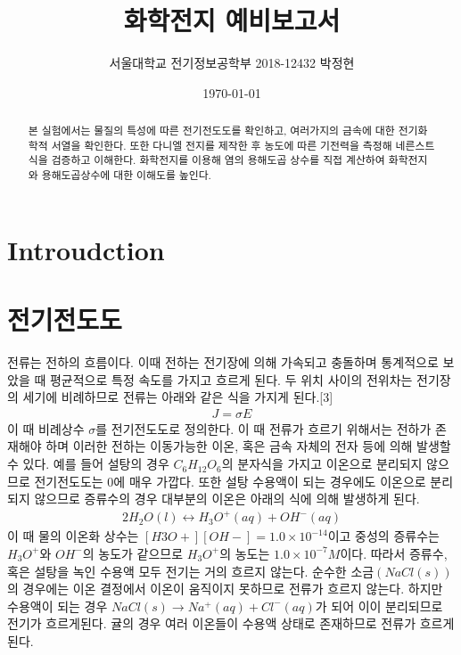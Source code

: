 \documentclass[%
 reprint,
 amsmath,amssymb,
 aps,
]{revtex4-2}
\begin{document}
\title{화학전지 예비보고서}

\author{서울대학교 전기정보공학부 2018-12432 박정현}
\date{\today}%

\begin{abstract}
본 실험에서는 물질의 특성에 따른 전기전도도를 확인하고, 여러가지의 금속에 대한 전기화학적 서열을 확인한다. 또한 다니엘 전지를 제작한 후 농도에 따른 기전력을 측정해 네른스트 식을 검증하고 이해한다. 화학전지를 이용해 염의 용해도곱 상수를 직접 계산하여 화학전지와 용해도곱상수에 대한 이해도를 높인다. 
\end{abstract}

\maketitle


\section{\label{sec:level1}Introudction}
\section{\label{sec:level2}전기전도도}
전류는 전하의 흐름이다. 이때 전하는 전기장에 의해 가속되고 충돌하며 통계적으로 보았을 때 평균적으로 특정 속도를 가지고 흐르게 된다. 두 위치 사이의 전위차는 전기장의 세기에 비례하므로 전류는 아래와 같은 식을 가지게 된다.[3]
\begin{align}
J =\sigma E
\end{align}
이 때 비례상수 $\sigma$를 전기전도도로 정의한다. 이 때 전류가 흐르기 위해서는 전하가 존재해야 하며 이러한 전하는 이동가능한 이온, 혹은 금속 자체의 전자 등에 의해 발생할 수 있다. 예를 들어 설탕의 경우 $C_{6}H_{12}O_{6}$의 분자식을 가지고 이온으로 분리되지 않으므로 전기전도도는 0에 매우 가깝다. 또한 설탕 수용액이 되는 경우에도 이온으로 분리되지 않으므로 증류수의 경우 대부분의 이온은 아래의 식에 의해 발생하게 된다.
\begin{align}
2H_{2}O(l) \leftrightarrow H_{3}O^{+}(aq) + OH^{-}(aq)
\end{align}
이 때 물의 이온화 상수는 $[H3O+][OH-] = 1.0\times10^{-14}$이고 중성의 증류수는 $H_{3}O^{+}$와 $OH^{-}$의 농도가 같으므로 $H_{3}O^{+}$의 농도는 $1.0\times 10^{-7}M$이다. 따라서 증류수, 혹은 설탕을 녹인 수용액 모두 전기는 거의 흐르지 않는다. 순수한 소금$(NaCl(s))$의 경우에는 이온 결정에서 이온이 움직이지 못하므로 전류가 흐르지 않는다. 하지만 수용액이 되는 경우 $NaCl(s) \rightarrow Na^{+}(aq) + Cl^{-}(aq)$가 되어 이이 분리되므로 전기가 흐르게된다. 귤의 경우 여러 이온들이 수용액 상태로 존재하므로 전류가 흐르게 된다.\\
\end{document}
